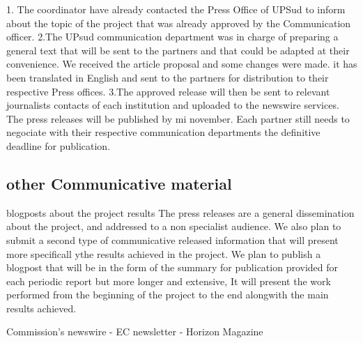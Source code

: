 \documentclass{deliverablereport}
\begin{document}
 1. The coordinator have already contacted the Press Office of UPSud to inform about the topic
 of the project that was already approved by the Communication officer. 
 2.The UPsud communication department was in charge of preparing a general text that will be sent
 to the partners and that could be adapted at their convenience. We received the article proposal 
 and some changes were made. it has been translated in English and sent to the partners 
 for distribution to their respective Press offices. 
 3.The approved release will then be sent to relevant journalists contacts of each institution 
 and uploaded to the newswire services. The press releases will be published by mi november. 
 Each partner still needs to negociate with their respective communication departments the definitive deadline for publication.

\subsection{other Communicative material}

 \item blogposts about the project results
 The press releases are a general dissemination about the project, and addressed to 
 a non specialist audience. We also plan to submit a second type of communicative released 
 information that will present more specificall ythe results achieved in the project.
 We plan to publish a blogpost that will be in the form of the summary for publication
 provided for each periodic report but more longer and  extensive, It will present the 
 work performed from the beginning of the project to the end alongwith the main results achieved.
 
 \European Commission's newswire
 - EC newsletter
 - Horizon Magazine
\end{document}
